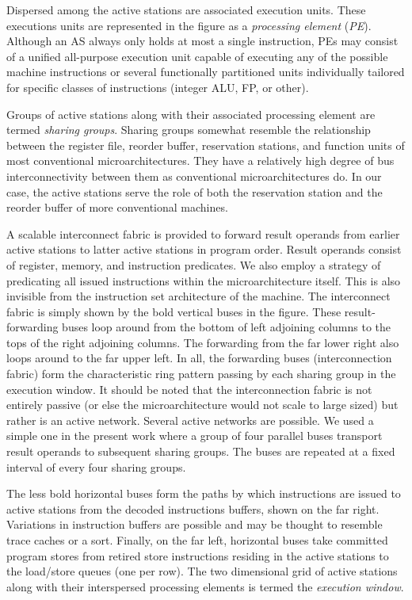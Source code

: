 \documentclass[10pt,dvips]{article}
\begin{document}
Dispersed among the active stations are associated execution
units.  These executions units are represented in the figure as
a \textit{processing element} (\textit{PE}).  
Although an AS always only holds at most a single instruction,
PEs may consist of a unified all-purpose execution unit capable of
executing any of the possible machine instructions or
several functionally partitioned units individually tailored
for specific classes of instructions (integer ALU, FP, or other).

Groups of active stations along with their associated processing
element
are termed \textit{sharing groups}.  Sharing groups somewhat resemble
the relationship between the register file, reorder buffer,
reservation stations, and function units of most conventional
microarchitectures.  They have a relatively high degree of bus
interconnectivity between them as conventional microarchitectures do.
In our case, the active stations serve the role of both the
reservation station and the reorder buffer of more conventional
machines.

A scalable interconnect fabric 
is provided to forward result
operands from earlier active stations to latter active stations in
program order.  Result operands consist of register, memory, and
instruction predicates.  We also employ a strategy of predicating all
issued instructions within the microarchitecture itself.  This is also 
invisible from the instruction set architecture of the machine.
The interconnect fabric is simply shown by
the bold vertical buses in the figure.  These result-forwarding buses
loop around from the bottom of left adjoining columns to the tops of
the right adjoining columns.  The forwarding from the far lower right
also loops around to the far upper left.  In all, the forwarding
buses (interconnection fabric) form the characteristic ring pattern
passing by each sharing group in the execution window.
It should be noted that the interconnection fabric is not
entirely passive (or else the microarchitecture would not
scale to large sized) but rather is an active network.
Several active networks are possible.  We used a simple one
in the present work where a group of four parallel buses transport
result operands to subsequent sharing groups.  The buses are repeated
at a fixed interval of every four sharing groups.

The less bold horizontal buses
form the paths by which instructions are issued to active stations
from the decoded instructions buffers, shown on the far right.
Variations in instruction buffers are possible and may be thought
to resemble trace caches or a sort.
Finally, on the far left, horizontal buses take committed program
stores from retired store instructions residing in the active stations
to the load/store queues (one per row).
The two dimensional
grid of active stations along with their interspersed processing elements
is termed the \textit{execution window}.
\end{document}
